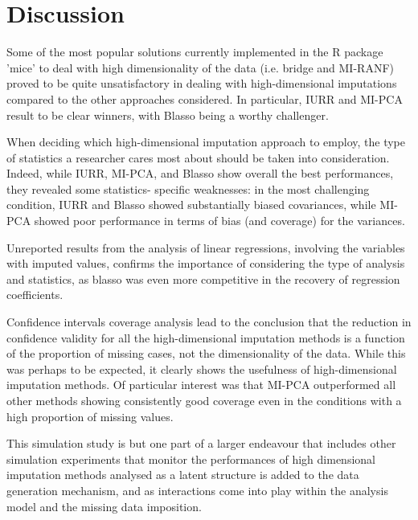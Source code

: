 \maketitle
\section{Discussion}

Some of the most popular solutions currently implemented in the R package 'mice' to deal with high dimensionality of 
the data (i.e. bridge and MI-RANF) proved to be quite unsatisfactory in dealing with high-dimensional imputations compared 
to the other approaches considered. In particular, IURR and MI-PCA result to be clear winners, with Blasso being a 
worthy challenger.

When deciding which high-dimensional imputation approach to employ, the type of statistics a researcher cares most about should be taken 
into consideration. Indeed, while IURR, MI-PCA, and Blasso show overall the best performances, they revealed some statistics-
specific weaknesses: in the most challenging condition, IURR and Blasso showed substantially biased covariances, 
while MI-PCA showed poor performance in terms of bias (and coverage) for the variances.

Unreported results from the analysis of linear regressions, involving the variables with imputed values, confirms
the importance of considering the type of analysis and statistics, as blasso was even more competitive in the recovery 
of regression coefficients.

Confidence intervals coverage analysis lead to the conclusion that the reduction in confidence 
validity for all the high-dimensional imputation methods is a function of the proportion of missing cases, not the 
dimensionality of the data. While this was perhaps to be expected, it clearly shows the usefulness of high-dimensional 
imputation methods.  
Of particular interest was that MI-PCA outperformed all other methods showing consistently good
coverage even in the conditions with a high proportion of missing values.

This simulation study is but one part of a larger endeavour that includes other simulation experiments that 
monitor the performances of high dimensional imputation methods analysed as a latent structure is added to the data 
generation mechanism, and as interactions come into play within the analysis model and the missing data imposition.

